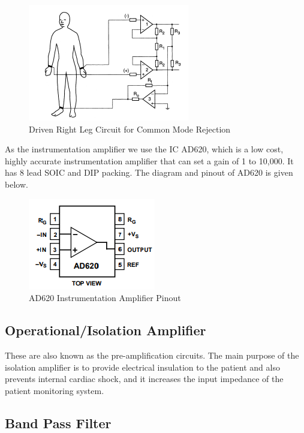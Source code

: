 \documentclass[11pt,a4paper,headinclude=false,footinclude=false]{scrreprt}
\begin{document}
\begin{figure}[H]
\includegraphics{Images/Hardware/DrivenRightLeg.png}
\centering
\caption{Driven Right Leg Circuit for Common Mode Rejection \cite{tweed}}
\label{drivenright}
\end{figure}

As the instrumentation amplifier we use the IC AD620, which is a low
cost, highly accurate instrumentation amplifier that can set a gain of 1
to 10,000. It has 8 lead SOIC and DIP packing. The diagram and pinout of
AD620 is given below.

\begin{figure}[H]
\includegraphics{Images/Hardware/InstrumentationAmplifier.png}
\centering
\caption{AD620 Instrumentation Amplifier Pinout\cite{analog}}
\label{ad620}
\end{figure}

\hypertarget{operationalisolation-amplifier}{%
\subsection{Operational/Isolation
Amplifier}\label{operationalisolation-amplifier}}

These are also known as the pre-amplification circuits. The main purpose
of the isolation amplifier is to provide electrical insulation to the
patient and also prevents internal cardiac shock, and it increases the
input impedance of the patient monitoring system.

\hypertarget{band-pass-filter}{%
\subsection{Band Pass Filter}\label{band-pass-filter}}
\end{document}
